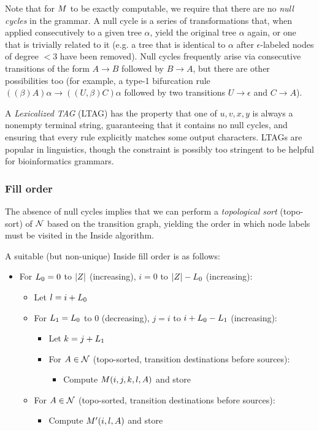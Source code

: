 \documentclass[10pt]{article}
\begin{document}
Note that for $M$ to be exactly computable, we require that there are no {\em null cycles} in the grammar.
A null cycle is a series of transformations that, when applied consecutively to a given tree $\alpha$, yield the original tree $\alpha$ again,
or one that is trivially related to it (e.g. a tree that is identical to $\alpha$ after $\epsilon$-labeled nodes of degree $<3$ have been removed).
Null cycles frequently arise via consecutive transitions of the form $A \to B$ followed by $B \to A$,
but there are other possibilities too (for example, a type-1 bifurcation rule $((\beta)A)\alpha \to ((U,\beta)C)\alpha$
followed by two transitions $U \to \epsilon$ and $C \to A$).

A {\em Lexicalized TAG} (LTAG) has the property that one of $u,v,x,y$ is always a nonempty terminal string,
guaranteeing that it contains no null cycles,
and ensuring that every rule explicitly matches some output characters.
LTAGs are popular in linguistics, though the constraint is possibly too stringent to be helpful for bioinformatics grammars.

\subsubsection{Fill order}

The absence of null cycles implies that we can perform a {\em topological sort} (topo-sort) of ${\cal N}$ based on the transition graph,
yielding the order in which node labels must be visited in the Inside algorithm.

A suitable (but non-unique) Inside fill order is as follows:
\begin{itemize}
 \item For $L_0 = 0$ to $|Z|$ (increasing), \quad $i = 0$ to $|Z|-L_0$ (increasing):
 \begin{itemize}
  \item Let $l = i + L_0$
  \item For $L_1 = L_0$ to $0$ (decreasing), \quad $j = i$ to $i + L_0 - L_1$ (increasing):
  \begin{itemize}
   \item Let $k = j + L_1$
   \item For $A \in {\cal N}$ (topo-sorted, transition destinations before sources):
   \begin{itemize}
    \item Compute $M(i,j,k,l,A)$ and store
   \end{itemize}
  \end{itemize}
  \item For $A \in {\cal N}$ (topo-sorted, transition destinations before sources):
  \begin{itemize}
   \item Compute $M'(i,l,A)$ and store
  \end{itemize}
 \end{itemize}
\end{itemize}
\end{document}
